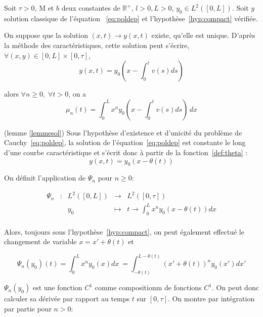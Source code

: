 \documentclass[a4paper]{article}
\newcommand{\mass}{\mathrm{M}}
\newcommand{\dep}{b}
\begin{document}
\begin{lemme}
	\label{lemmesol}
	Soit $\tau>0$, $\mass$ et $\dep$ deux constantes de $\mathbb{R}^+$, 
	$l>0, L>0$, $y_0 \in L^2([0,L])$.
	Soit $y$ solution classique de l'équation ~\eqref{eq:poldep} et l'hypothèse~\eqref{hyp:compact} vérifiée.
	
	On suppose que la solution $(x,t) \to y(x,t)$ existe, qu'elle est unique. 
	D'après la méthode des caractéristiques, cette solution peut s'écrire,
	 $\forall (x,y) \in [0,L] \times [0, \tau]$, 
	\[y(x,t) = y_0(x-\int_{0}^t v(s)ds) \]
	
	alors $\forall n \geq 0, \; \forall t>0$, on a 
	\[\mu_n(t) = \int_0^L x^n y_0(x-\int_{0}^t v(s)ds) \, dx \]
\end{lemme}

\begin{preuve}
	(lemme \ref{lemmesol})
	Sous l'hypothèse d'existence et d'unicité du problème de Cauchy~\eqref{eq:poldep}, la solution de l'équation~\eqref{eq:poldep} est constante le long d'une courbe caractéristique et s'écrit donc à partir de la fonction~\eqref{def:theta} :
\[ y(x,t) = y_0(x-\theta(t)) \]
\end{preuve}
  
  
 On définit l'application de $\Psi_n$ pour $n \geq 0$:

   \begin{equation}
  	\begin{array}{ccccc}
  	\Psi_n & : & L^2([0,L]) & \to & L^2([0,\tau]) \\
  	 & & y_0 & \mapsto & t \to \int_0^L x^n y_0(x-\theta(t)) dx\\
  	\end{array}
  \end{equation}
  
  
Alors, toujours sous l'hypothèse~\eqref{hyp:compact}, on peut également effectué le changement de variable $x =x'+\theta(t)$ et
  
\[ \Psi_n (y_0) (t) = \int_0^L x^n y_0(x) dx\ = \int_{-\theta(t)}^{L - \theta(t)} (x'+\theta(t))^ny_0(x')dx'\]
  
$\Psi_n (y_0)$ est une fonction $C^1$ comme compositionm de fonctions $C^1$.
On peut donc calculer sa dérivée par rapport au temps $t$ sur $[0,\tau]$.
On montre par intégration par partie pour $n>0$:
  
\end{document}
